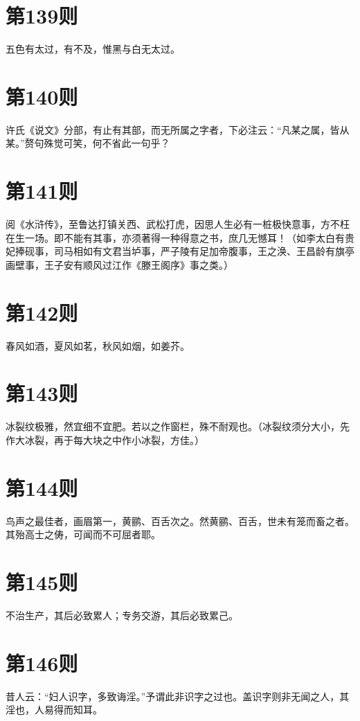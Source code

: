 \documentclass[12pt,a4paper]{ctexbook}
\begin{document}
\section{第139则}
五色有太过，有不及，惟黑与白无太过。\par

\section{第140则}
许氏《说文》分部，有止有其部，而无所属之字者，下必注云：“凡某之属，皆从某。”赘句殊觉可笑，何不省此一句乎？\par

\section{第141则}
阅《水浒传》，至鲁达打镇关西、武松打虎，因思人生必有一桩极快意事，方不枉在生一场。即不能有其事，亦须著得一种得意之书，庶几无憾耳！（如李太白有贵妃捧砚事，司马相如有文君当垆事，严子陵有足加帝腹事，王之涣、王昌龄有旗亭画壁事，王子安有顺风过江作《滕王阁序》事之类。）\par

\section{第142则}
春风如酒，夏风如茗，秋风如烟，如姜芥。\par

\section{第143则}
冰裂纹极雅，然宜细不宜肥。若以之作窗栏，殊不耐观也。（冰裂纹须分大小，先作大冰裂，再于每大块之中作小冰裂，方佳。）\par

\section{第144则}
鸟声之最佳者，画眉第一，黄鹂、百舌次之。然黄鹂、百舌，世未有笼而畜之者。其殆高士之俦，可闻而不可屈者耶。\par

\section{第145则}
不治生产，其后必致累人；专务交游，其后必致累己。\par

\section{第146则}
昔人云：“妇人识字，多致诲淫。”予谓此非识字之过也。盖识字则非无闻之人，其淫也，人易得而知耳。\par
\end{document}
